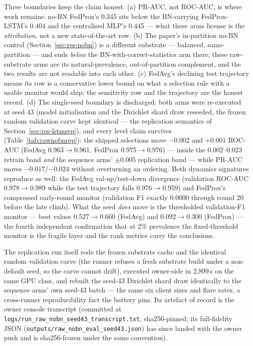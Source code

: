 Three boundaries keep the claim honest. (a) PR-AUC, not ROC-AUC, is
where work remains: no-BN FedProx's 0.345 sits below the
BN-carrying FedProx-LSTM's 0.404 and the centralised MLP's 0.445 ---
what these arms license is the \emph{attribution}, not a new
state-of-the-art row. (b) The paper's in-partition no-BN control
(Section~\ref{sec:res-nobn}) is a different substrate --- balanced,
same-partition --- and ends \emph{below} the
BN-with-correct-statistics arm there; these raw-substrate arms are
its natural-prevalence, out-of-partition complement, and the two
results are not readable into each other. (c) FedAvg's declining
test trajectory means its row is a conservative lower bound on what
a selection rule with a usable monitor would ship; the sensitivity
row and the trajectory are the honest record. (d) The single-seed boundary is
discharged: both arms were re-executed at seed 43 (model
initialisation and the Dirichlet shard draw reseeded, the frozen
random validation carve kept identical --- the replication
semantics of Section~\ref{sec:res-lstmrep}), and every level claim
survives (Table~\ref{tab:rawnobnrep}): the shipped selections move
$-0.002$ and $+0.001$ ROC-AUC (FedAvg 0.963$\to$0.961, FedProx
0.975$\to$0.976) --- inside the $0.002$--$0.023$ retrain band
\emph{and} the sequence arms' $\pm$0.005 replication band --- while
PR-AUC moves $-0.017$/$-0.024$ without overturning an ordering.
Both dynamics signatures reproduce as well: the FedAvg
val-up/test-down divergence (validation ROC-AUC 0.978$\to$0.989
while the test trajectory falls 0.976$\to$0.959) and FedProx's
compressed early-round monitor (validation F1 exactly 0.0000
through round 20 before the late climb). What the seed \emph{does}
move is the thresholded validation-F1 monitor --- best values
0.527$\to$0.660 (FedAvg) and 0.092$\to$0.300 (FedProx) --- the
fourth independent confirmation that at 2\% prevalence the
fixed-threshold monitor is the fragile layer and the rank metrics
carry the conclusions.

The replication run itself rode the frozen substrate cache and the
identical random validation carve (the runner refuses a fresh
substrate build under a non-default seed, so the carve cannot
drift), executed owner-side in 2{,}899\,s on the same GPU class,
and rebuilt the seed-43 Dirichlet shard draw identically to the
sequence arms' own seed-43 batch --- the same six client sizes and
flare rates, a cross-runner reproducibility fact the battery pins.
Its artefact of record is the owner console transcript (committed
at \texttt{logs/run\_raw\_nobn\_seed43\_transcript.txt},
sha256-pinned; its full-fidelity JSON
(\texttt{outputs/raw\_nobn\_eval\_seed43.json}) has since landed
with the owner push and is sha256-frozen under the same
convention).

